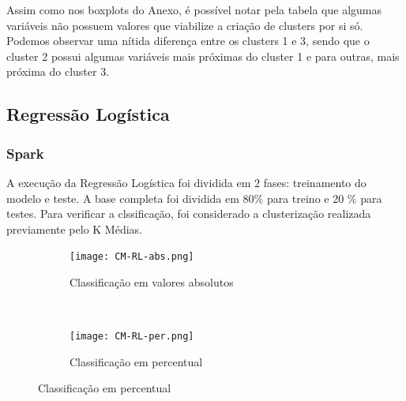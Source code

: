 Assim como nos boxplots do Anexo, é possível notar pela tabela que algumas variáveis não possuem valores que viabilize a criação de clusters por si só.
Podemos observar uma nítida diferença entre os clusters 1 e 3, sendo que o cluster 2 possui algumas variáveis mais próximas do cluster 1 e para outras, mais próxima do cluster 3.


\subsection{Regressão Logística}


\subsubsection{Spark}

A execução da Regressão Logística foi dividida em 2 fases: treinamento do modelo e teste. A base completa foi dividida em 80\% para treino e 20 \% para testes. Para verificar a clssificação, foi considerado a clusterização realizada previamente pelo K Médias. 





\begin{figure}[!ht]
    \centering
        \caption{Resultados da clusterização da Regressão Logística}
    \begin{subfigure}[t]{0.45\textwidth}
        \centering
\texttt{[image: CM-RL-abs.png]}

        \caption{Classificação em valores absolutos}
    \end{subfigure}%
    ~ 
    \begin{subfigure}[t]{0.45\textwidth}
        \centering
        \texttt{[image: CM-RL-per.png]}
        \caption{Classificação em percentual}
    \end{subfigure}

\end{figure}

